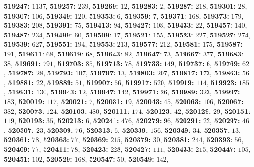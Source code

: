 \textsf{\bfseries 519247:} $1137$, \textsf{\bfseries 519257:} $239$, \textsf{\bfseries 519269:} $12$, \textsf{\bfseries 519283:} $2$, \textsf{\bfseries 519287:} $218$, \textsf{\bfseries 519301:} $28$, \textsf{\bfseries 519307:} $106$, \textsf{\bfseries 519349:} $120$, \textsf{\bfseries 519353:} $6$, \textsf{\bfseries 519359:} $7$, \textsf{\bfseries 519371:} $168$, \textsf{\bfseries 519373:} $179$, \textsf{\bfseries 519383:} $208$, \textsf{\bfseries 519391:} $75$, \textsf{\bfseries 519413:} $94$, \textsf{\bfseries 519427:} $108$, \textsf{\bfseries 519433:} $22$, \textsf{\bfseries 519457:} $140$, \textsf{\bfseries 519487:} $234$, \textsf{\bfseries 519499:} $60$, \textsf{\bfseries 519509:} $17$, \textsf{\bfseries 519521:} $155$, \textsf{\bfseries 519523:} $227$, \textsf{\bfseries 519527:} $274$, \textsf{\bfseries 519539:} $627$, \textsf{\bfseries 519551:} $194$, \textsf{\bfseries 519553:} $213$, \textsf{\bfseries 519577:} $212$, \textsf{\bfseries 519581:} $175$, \textsf{\bfseries 519587:} $191$, \textsf{\bfseries 519611:} $68$, \textsf{\bfseries 519619:} $68$, \textsf{\bfseries 519643:} $82$, \textsf{\bfseries 519647:} $73$, \textsf{\bfseries 519667:} $377$, \textsf{\bfseries 519683:} $38$, \textsf{\bfseries 519691:} $791$, \textsf{\bfseries 519703:} $85$, \textsf{\bfseries 519713:} $78$, \textsf{\bfseries 519733:} $149$, \textsf{\bfseries 519737:} $6$, \textsf{\bfseries 519769:} $62$, \textsf{\bfseries 519787:} $28$, \textsf{\bfseries 519793:} $107$, \textsf{\bfseries 519797:} $13$, \textsf{\bfseries 519803:} $207$, \textsf{\bfseries 519817:} $173$, \textsf{\bfseries 519863:} $56$, \textsf{\bfseries 519881:} $22$, \textsf{\bfseries 519889:} $51$, \textsf{\bfseries 519907:} $66$, \textsf{\bfseries 519917:} $520$, \textsf{\bfseries 519919:} $114$, \textsf{\bfseries 519923:} $185$, \textsf{\bfseries 519931:} $130$, \textsf{\bfseries 519943:} $12$, \textsf{\bfseries 519947:} $142$, \textsf{\bfseries 519971:} $26$, \textsf{\bfseries 519989:} $323$, \textsf{\bfseries 519997:} $183$, \textsf{\bfseries 520019:} $117$, \textsf{\bfseries 520021:} $7$, \textsf{\bfseries 520031:} $19$, \textsf{\bfseries 520043:} $45$, \textsf{\bfseries 520063:} $106$, \textsf{\bfseries 520067:} $382$, \textsf{\bfseries 520073:} $124$, \textsf{\bfseries 520103:} $480$, \textsf{\bfseries 520111:} $174$, \textsf{\bfseries 520123:} $42$, \textsf{\bfseries 520129:} $29$, \textsf{\bfseries 520151:} $119$, \textsf{\bfseries 520193:} $35$, \textsf{\bfseries 520213:} $6$, \textsf{\bfseries 520241:} $476$, \textsf{\bfseries 520279:} $96$, \textsf{\bfseries 520291:} $22$, \textsf{\bfseries 520297:} $46$, \textsf{\bfseries 520307:} $23$, \textsf{\bfseries 520309:} $76$, \textsf{\bfseries 520313:} $6$, \textsf{\bfseries 520339:} $156$, \textsf{\bfseries 520349:} $34$, \textsf{\bfseries 520357:} $13$, \textsf{\bfseries 520361:} $78$, \textsf{\bfseries 520363:} $77$, \textsf{\bfseries 520369:} $215$, \textsf{\bfseries 520379:} $30$, \textsf{\bfseries 520381:} $244$, \textsf{\bfseries 520393:} $56$, \textsf{\bfseries 520409:} $77$, \textsf{\bfseries 520411:} $78$, \textsf{\bfseries 520423:} $228$, \textsf{\bfseries 520427:} $111$, \textsf{\bfseries 520433:} $215$, \textsf{\bfseries 520447:} $105$, \textsf{\bfseries 520451:} $102$, \textsf{\bfseries 520529:} $168$, \textsf{\bfseries 520547:} $50$, \textsf{\bfseries 520549:} $142$, 
